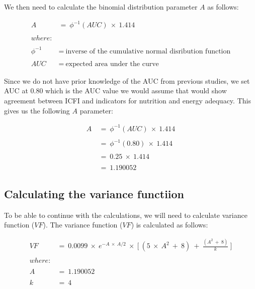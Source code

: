 \documentclass[12pt,a4paper]{article}
\theoremstyle{definition}
\theoremstyle{definition}
\theoremstyle{definition}
\theoremstyle{remark}
\begin{document}
We then need to calculate the binomial distribution parameter \(A\) as
follows:

\[ \begin{aligned}
A ~ & = ~ \phi ^ {-1}(AUC) ~ \times ~ 1.414 \\
\\
where: & \\
\\
\phi ^ {-1} ~ & = ~ \text{inverse of the cumulative normal disribution function} \\
\\
AUC ~ & = ~ \text{expected area under the curve}
\end{aligned} \]

Since we do not have prior knowledge of the AUC from previous studies,
we set AUC at 0.80 which is the AUC value we would assume that would
show agreement between ICFI and indicators for nutrition and energy
adequacy. This gives us the following \(A\) parameter:

\[ \begin{aligned}
A ~ & = ~ \phi ^ {-1}(AUC) ~ \times ~ 1.414 \\
\\
& = ~ \phi ^ {-1}(0.80) ~ \times ~ 1.414 \\
\\
& = ~ 0.25 ~ \times ~ 1.414 \\
\\
& = ~ 1.190052
\end{aligned} \]

\hypertarget{calculating-the-variance-functiion}{%
\subsection{Calculating the variance
functiion}\label{calculating-the-variance-functiion}}

To be able to continue with the calculations, we will need to calculate
variance function (\(VF\)). The variance function (\(VF\)) is calculated
as follows:

\[ \begin{aligned}
VF ~ & = ~ 0.0099 ~ \times ~ e ^ {-A ~ \times ~ A/2} ~ \times ~ \Bigg [ ~ (5 ~ \times ~ A ^ 2 ~ + ~ 8) ~ + ~ \frac{(A ^ 2 ~ + ~ 8)}{k} ~ \Bigg ] \\
\\
where: & \\
\\
A ~ & = ~ 1.190052 \\
\\
k ~ & = ~ 4
\end{aligned}\]
\end{document}
